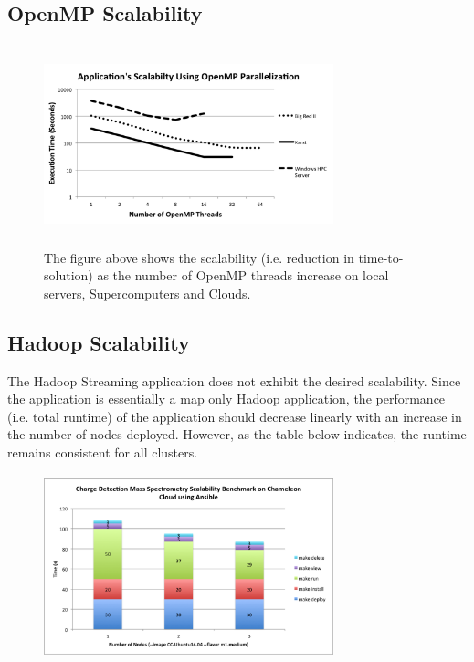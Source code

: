 \documentclass[9pt,twocolumn,twoside]{../../styles/osajnl}
\begin{document}
\subsection{OpenMP Scalability} \label{omp-scalability}
\begin{figure}
\centering
\includegraphics[height=2.3in, width=3.3in]{images/scalability2}
\caption{The figure above shows the scalability (i.e. reduction in
  time-to-solution) as the number of OpenMP threads increase on local
  servers, Supercomputers and Clouds.}
\label{fig:scalability2}
\end{figure}

\subsection{Hadoop Scalability} \label{hadoop-scalability}
The Hadoop Streaming application does not exhibit the desired
scalability. Since the application is essentially a map only Hadoop
application, the performance (i.e. total runtime) of the application
should decrease linearly with an increase in the number of nodes
deployed. However, as the table below indicates, the runtime remains
consistent for all clusters.

\begin{figure}
\centering
\includegraphics[height=2.1in, width=3.3in]{images/benchmark}
\caption{}
\label{fig:benchmark}
\end{figure}
\end{document}
